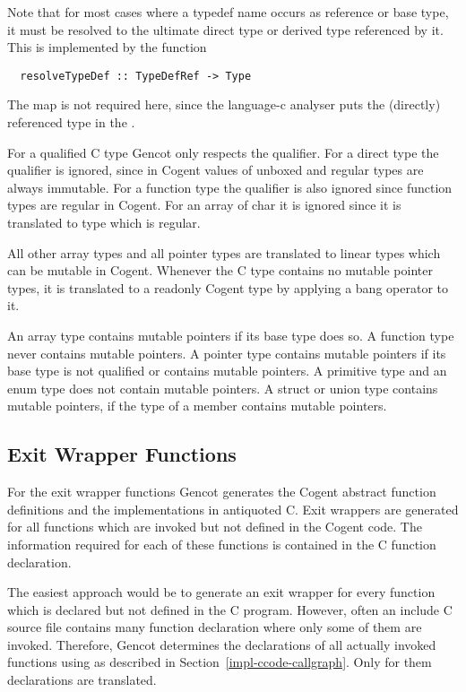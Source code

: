 Note that for most cases where a typedef name occurs as reference or base type, it must be resolved to
the ultimate direct type or derived type referenced by it. This is implemented by the function
\begin{verbatim}
  resolveTypeDef :: TypeDefRef -> Type 
\end{verbatim}
The  map is not required here, since the language-c analyser puts the (directly) 
referenced type in the . 

For a qualified C type Gencot only respects the  qualifier. For a direct type the 
qualifier is ignored, since in Cogent values of unboxed and regular types are always immutable. For
a function type the qualifier is also ignored since function types are regular in Cogent. For an array
of char it is ignored since it is translated to type  which is regular.

All other array types and all pointer types are translated to linear types which can be mutable in
Cogent. Whenever the C type contains no mutable pointer types, it is translated to a readonly Cogent type by 
applying a bang operator to it.

An array type contains mutable pointers if its base type does so. A function type never contains mutable pointers.
A pointer type contains mutable pointers if its base type is not  qualified or contains mutable pointers.
A primitive type and an enum type does not contain mutable pointers. A struct or union type contains mutable 
pointers, if the type of a member contains mutable pointers.

\subsection{Exit Wrapper Functions}
\label{impl-comps-exit}

For the exit wrapper functions Gencot generates the Cogent abstract function definitions and the implementations
in antiquoted C. Exit wrappers are generated for all functions which are invoked but not defined in the Cogent code. 
The information required for each of these functions is contained in the C function declaration.

The easiest approach would be to generate an exit wrapper for every function which is declared but 
not defined in the C program. However, often an
include C source file contains many function declaration where only some of them are invoked. Therefore, Gencot
determines the declarations of all actually invoked functions using  as described in 
Section~\ref{impl-ccode-callgraph}. Only for them declarations are translated.

